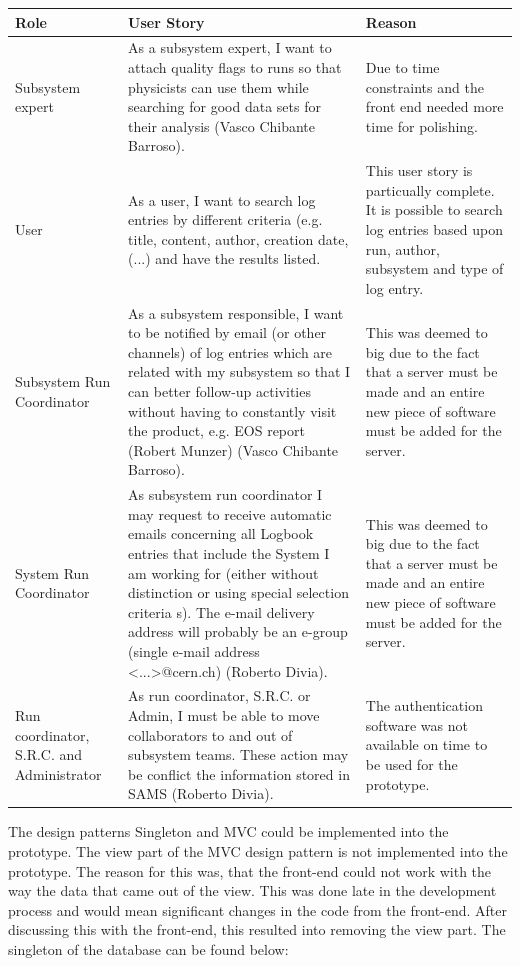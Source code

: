 \documentclass[paper=a4, fontsize=11pt,twoside]{scrartcl}	%
\begin{document}
\begin{longtable}{ | p{3cm} | p{7cm} | p{3cm}|}
\hline
Role & User Story & Reason \\ \hline
Subsystem expert & As a subsystem expert, I want to attach quality flags to runs so that physicists can use them while searching for good data sets for their analysis (Vasco Chibante Barroso).& Due to time constraints and the front end needed more time for polishing. \\ \hline
User & As a user, I want to search log entries by different criteria (e.g. title, content, author, creation date,(...) and have the results listed. & This user story is particually complete. It is possible to search log entries based upon run, author, subsystem and type of log entry. \\ \hline
Subsystem Run Coordinator &  As a subsystem responsible, I want to be notified by email (or other channels) of log entries which are related with my subsystem so that I can better follow-up activities without having to constantly visit the product, e.g. EOS report (Robert Munzer) (Vasco Chibante Barroso). & This was deemed to big due to the fact that a server must be made and an entire new piece of software must be added for the server. \\ \hline
System Run Coordinator & As subsystem run coordinator I may request to receive automatic emails concerning all Logbook entries that include the System I am working for (either without distinction or using special selection criteria s). The e-mail delivery address will probably be an e-group (single e-mail address <...>@cern.ch) (Roberto Divia). & This was deemed to big due to the fact that a server must be made and an entire new piece of software must be added for the server. \\ \hline
Run coordinator, S.R.C. and Administrator &  As run coordinator, S.R.C. or Admin, I must be able to move collaborators to and out of subsystem teams. These action may be conflict the information stored in SAMS (Roberto Divia). & The authentication software was not available on time to be used for the prototype. \\ \hline
\end{longtable}
The design patterns Singleton and MVC could be implemented into the prototype. The view part of the MVC design pattern is not implemented into the prototype. The reason for this was, that the front-end could not work with the way the data that came out of the view. This was done late in the development process and would mean significant changes in the code from the front-end. After discussing this with the front-end, this resulted into removing the view part. The singleton of the database can be found below: 
\end{document}
